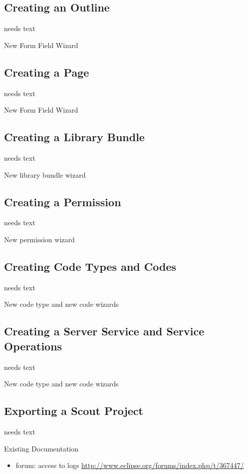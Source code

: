 \documentclass[a4paper,10pt,twoside]{book}
\begin{document}
\subsection{Creating an Outline}
needs text

New Form Field Wizard

\subsection{Creating a Page}
needs text

New Form Field Wizard


\subsection{Creating a Library Bundle}
needs text

New library bundle wizard

\subsection{Creating a Permission}
needs text

New permission wizard

\subsection{Creating Code Types and Codes}
needs text

New code type and new code wizards

\subsection{Creating a Server Service and Service Operations}
needs text

New code type and new code wizards

\subsection{Exporting a Scout Project}
needs text

\noindent Existing Documentation
\begin{itemize}
  \item forum: access to logs \url{http://www.eclipse.org/forums/index.php/t/367447/}
\end{itemize}

\ifx\wholebook\relax\else
   
   
\end{document}
